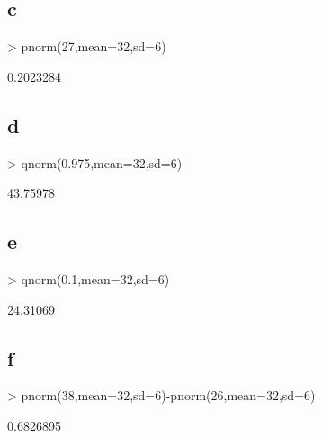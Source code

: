 \subsection{c}
\begin{Schunk}
\begin{Sinput}
> pnorm(27,mean=32,sd=6)
\end{Sinput}
\begin{Soutput}
[1] 0.2023284
\end{Soutput}
\end{Schunk}

\subsection{d}
\begin{Schunk}
\begin{Sinput}
> qnorm(0.975,mean=32,sd=6)
\end{Sinput}
\begin{Soutput}
[1] 43.75978
\end{Soutput}
\end{Schunk}

\subsection{e}
\begin{Schunk}
\begin{Sinput}
> qnorm(0.1,mean=32,sd=6)
\end{Sinput}
\begin{Soutput}
[1] 24.31069
\end{Soutput}
\end{Schunk}

\subsection{f}
\begin{Schunk}
\begin{Sinput}
> pnorm(38,mean=32,sd=6)-pnorm(26,mean=32,sd=6)
\end{Sinput}
\begin{Soutput}
[1] 0.6826895
\end{Soutput}
\end{Schunk}
